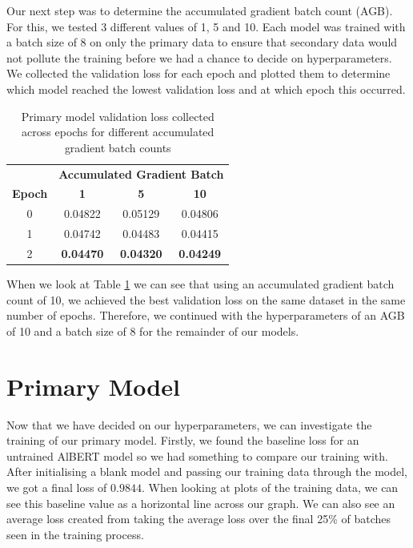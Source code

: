 Our next step was to determine the accumulated gradient batch count (AGB). For this, we tested 3 different values of 1, 5 and 10. Each model was trained with a batch size of 8 on only the primary data to ensure that secondary data would not pollute the training before we had a chance to decide on hyperparameters. We collected the validation loss for each epoch and plotted them to determine which model reached the lowest validation loss and at which epoch this occurred.

\begin{table}[ht]
    \centering
    \begin{tabular}{cccc}
        \toprule
        \multicolumn{1}{c}{}             & \multicolumn{3}{c}{\textbf{Accumulated Gradient Batch}}                                       \\
        \cmidrule{2-4}
        \multirow{-2}{*}{\textbf{Epoch}} & \textbf{1}                                              & \textbf{5}       & \textbf{10}      \\
        \midrule
        0                                & 0.04822                                                 & 0.05129          & 0.04806          \\
        1                                & 0.04742                                                 & 0.04483          & 0.04415          \\
        2                                & \textbf{0.04470}                                        & \textbf{0.04320} & \textbf{0.04249} \\
        \bottomrule
    \end{tabular}
    \vspace{5pt}
    \caption{Primary model validation loss collected across epochs for different accumulated gradient batch counts}
    \label{tab:agb_val_loss}
\end{table}

When we look at Table \ref{tab:agb_val_loss} we can see that using an accumulated gradient batch count of 10, we achieved the best validation loss on the same dataset in the same number of epochs. Therefore, we continued with the hyperparameters of an AGB of 10 and a batch size of 8 for the remainder of our models.

\section{Primary Model}

Now that we have decided on our hyperparameters, we can investigate the training of our primary model. Firstly, we found the baseline loss for an untrained AlBERT model so we had something to compare our training with. After initialising a blank model and passing our training data through the model, we got a final loss of $0.9844$. When looking at plots of the training data, we can see this baseline value as a horizontal line across our graph. We can also see an average loss created from taking the average loss over the final 25\% of batches seen in the training process.

